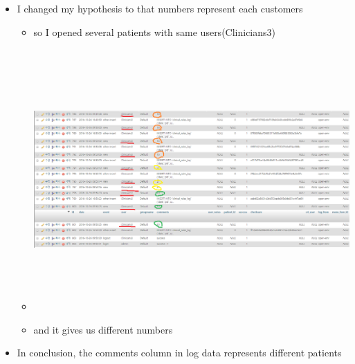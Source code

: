 \documentclass[paper=a4, fontsize=11pt]{scrartcl} %
\numberwithin{equation}{section} %
\numberwithin{figure}{section} %
\numberwithin{table}{section} %
\begin{document}
\begin{itemize}
\begin{itemize}
		\end{itemize}
	\item I changed my hypothesis to that numbers represent each customers
		\begin{itemize}
		\item so I opened several patients with same users(Clinicians3)
		\item
		 \includegraphics[width = 20cm, height=10cm]{pictures/samenumberinsamepatients.png}
		\item and it gives us different numbers
		\end{itemize}
	\item In conclusion, the comments column in log data represents different patients




				
\end{itemize}
\end{document}
